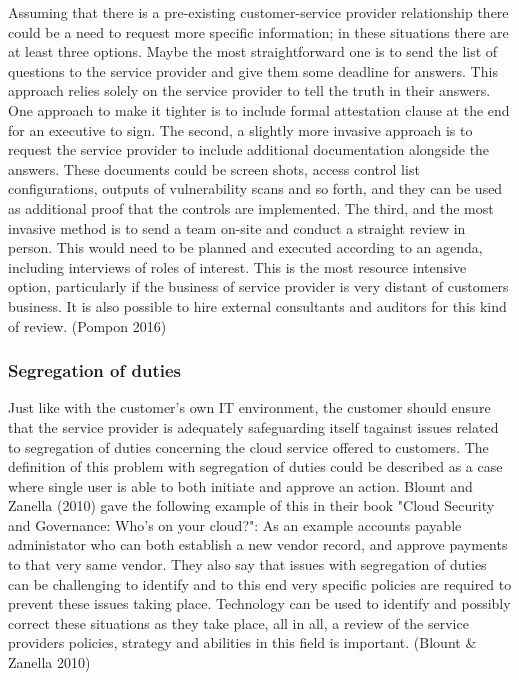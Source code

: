 \documentclass{article}
\begin{document}
Assuming that there is a pre-existing customer-service provider relationship there could be a need to request more specific information; in these situations there are at least three options. Maybe the most straightforward one is to send the list of questions to the service provider and give them some deadline for answers. This approach relies solely on the service provider to tell the truth in their answers. One approach to make it tighter is to include formal attestation clause at the end for an executive to sign. The second, a slightly more invasive approach is to request the service provider to include additional documentation alongside the answers. These documents could be screen shots, access control list configurations, outputs of vulnerability scans and so forth, and they can be used as additional proof that the controls are implemented. The third, and the most invasive method is to send a team on-site and conduct a straight review in person. This would need to be planned and executed according to an agenda, including interviews of roles of interest. This is the most resource intensive option, particularly if the business of service provider is very distant of customers business. It is also possible to hire external consultants and auditors for this kind of review. (Pompon 2016) 
\subsubsection{Segregation of duties}
Just like with the customer's own IT environment, the customer should ensure that the service provider is adequately safeguarding itself tagainst issues related to segregation of duties concerning the cloud service offered to customers.
The definition of this problem with segregation of duties could be described as a case where single user is able to both initiate and approve an action. Blount and Zanella (2010) gave the following example of this in their book "Cloud Security and Governance: Who's on your cloud?": As an example accounts payable administator who can both establish a new vendor record, and approve payments to that very same vendor. They also say that issues with segregation of duties can be challenging to identify and to this end very specific policies are required to prevent these issues taking place. Technology can be used to identify and possibly correct these situations as they take place, all in all, a review of the service providers policies, strategy and abilities in this field is important. (Blount \& Zanella 2010)
\end{document}
